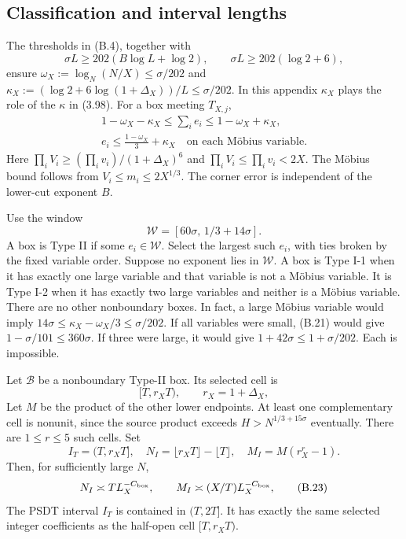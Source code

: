 \subsection*{Classification and interval lengths}

The thresholds in (B.4), together with
\[
 \sigma L\ge202(B\log L+\log2),\qquad
 \sigma L\ge202(\log2+6),
 \tag{B.20}
\]
ensure $\omega_X:=\log_N(N/X)\le\sigma/202$ and
$\kappa_X:=(\log2+6\log(1+\Delta_X))/L\le\sigma/202$. In this
appendix $\kappa_X$ plays the role of the $\kappa$ in (3.98).
For a box meeting $T_{X,j}$,
\[
 \begin{gathered}
 1-\omega_X-\kappa_X\le\sum_i e_i\le1-\omega_X+\kappa_X,\\
 e_i\le\frac{1-\omega_X}{3}+\kappa_X
 \quad\text{on each M\"obius variable}.
 \end{gathered}
 \tag{B.21}
\]
Here $\prod_i V_i\ge(\prod_i v_i)/(1+\Delta_X)^6$ and
$\prod_i V_i\le\prod_i v_i<2X$. The M\"obius bound follows from
$V_i\le m_i\le2X^{1/3}$. The corner error is independent of
the lower-cut exponent $B$.

Use the window
\[
 \mathcal W=[60\sigma,\,1/3+14\sigma].
\]
A box is Type II if some $e_i\in\mathcal W$. Select the largest such
$e_i$, with ties broken by the fixed variable order. Suppose no exponent
lies in $\mathcal W$. A box is Type I-1 when it has exactly one large
variable and that variable is not a M\"obius variable. It is Type I-2
when it has exactly two large variables and neither is a M\"obius
variable. There are no other nonboundary boxes. In fact, a large
M\"obius variable would imply
 $14\sigma\le\kappa_X-\omega_X/3\le\sigma/202$. If all variables were
small, (B.21) would give
 $1-\sigma/101\le360\sigma$. If three were large, it
would give $1+42\sigma\le1+\sigma/202$. Each is impossible.

\begin{lemma}
\label{lem:aa37-typeII-lengths}
Let $\mathcal B$
be a nonboundary Type-II box. Its selected cell is
\[
 [T,r_XT),\qquad r_X=1+\Delta_X,
\]
Let $M$ be the product of the other lower endpoints. At least one
complementary cell is nonunit, since the source product exceeds
$H>N^{1/3+15\sigma}$ eventually. There are $1\le r\le5$ such cells.
Set
\[
 I_T=(T,r_XT],\quad
 N_I=\lfloor r_XT\rfloor-\lfloor T\rfloor,\quad
 M_I=M(r_X^r-1).
 \tag{B.22}
\]
Then, for sufficiently large $N$,
\[
 N_I\asymp T L_X^{-C_{\rm box}},\qquad
 M_I\asymp (X/T)L_X^{-C_{\rm box}},
 \tag{B.23}
\]
The PSDT interval $I_T$ is contained in $(T,2T]$. It has exactly
the same selected integer coefficients as the half-open cell
$[T,r_XT)$.
\end{lemma}

